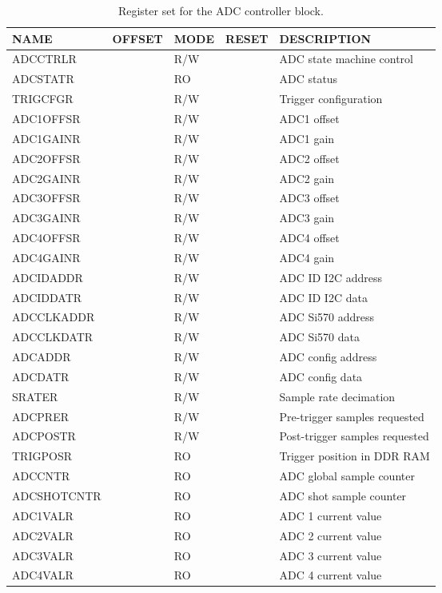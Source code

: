 \documentclass{article}
\begin{document}
\begin{table}[htbp]
  \centering
  \begin{tabularx}{\textwidth}{|l|r|l|l|X|}
    \hline
    \textbf{NAME} & \textbf{OFFSET} & \textbf{MODE} & \textbf{RESET} & \textbf{DESCRIPTION} \\
    \hline
    \hline
    ADCCTRLR & & R/W & & ADC state machine control\\
    \hline
    ADCSTATR & & RO & & ADC status \\
    \hline
    TRIGCFGR & & R/W & & Trigger configuration \\
    \hline
    ADC1OFFSR & & R/W & & ADC1 offset \\
    \hline
    ADC1GAINR & & R/W & & ADC1 gain \\
    \hline
    ADC2OFFSR & & R/W & & ADC2 offset \\
    \hline
    ADC2GAINR & & R/W & & ADC2 gain \\
    \hline
    ADC3OFFSR & & R/W & & ADC3 offset \\
    \hline
    ADC3GAINR & & R/W & & ADC3 gain \\
    \hline
    ADC4OFFSR & & R/W & & ADC4 offset \\
    \hline
    ADC4GAINR & & R/W & & ADC4 gain \\
    \hline
    ADCIDADDR & & R/W & & ADC ID I2C address \\
    \hline
    ADCIDDATR & & R/W & & ADC ID I2C data \\
    \hline
    ADCCLKADDR & & R/W & & ADC Si570 address \\
    \hline
    ADCCLKDATR & & R/W & & ADC Si570 data \\
    \hline
    ADCADDR & & R/W & & ADC config address \\
    \hline
    ADCDATR & & R/W & & ADC config data \\
    \hline
    SRATER & & R/W & & Sample rate decimation \\
    \hline
    ADCPRER & & R/W & & Pre-trigger samples requested \\
    \hline
    ADCPOSTR & & R/W & & Post-trigger samples requested \\
    \hline
    TRIGPOSR & & RO & & Trigger position in DDR RAM\\
    \hline
    ADCCNTR & & RO & & ADC global sample counter \\
    \hline
    ADCSHOTCNTR & & RO & & ADC shot sample counter \\
    \hline
    ADC1VALR & & RO & & ADC 1 current value \\
    \hline
    ADC2VALR & & RO & & ADC 2 current value \\
    \hline
    ADC3VALR & & RO & & ADC 3 current value \\
    \hline
    ADC4VALR & & RO & & ADC 4 current value \\
    \hline
  \end{tabularx}
  \caption{Register set for the ADC controller block.}
  \label{tab:adc_control}
\end{table}
\end{document}
